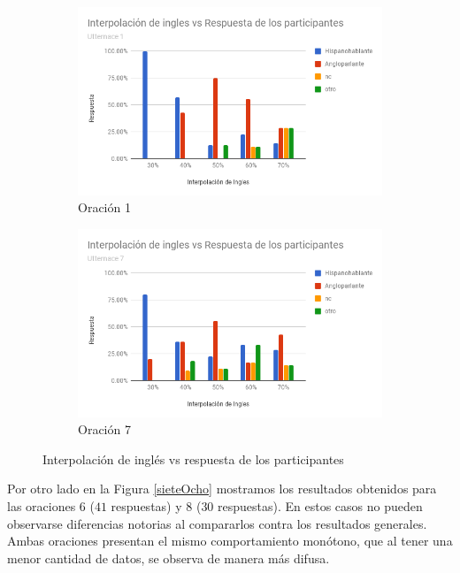 \begin{figure}
\centering
\begin{subfigure}{.5\textwidth}
  \centering
	\includegraphics[trim={0 0 0 2.5cm},clip,width=1\textwidth]{imagenes/nacionalidades/1.png}
  \caption{Oración 1}
\end{subfigure}%
\begin{subfigure}{.5\textwidth}
  \centering
	\includegraphics[trim={0 0 0 2.5cm},clip,width=1\textwidth]{imagenes/nacionalidades/7.png}
  \caption{Oración 7}
\end{subfigure}
\caption{Interpolación de inglés vs respuesta de los participantes}
\label{unoSeis}
\end{figure}


Por otro lado en la Figura \ref{sieteOcho} mostramos los resultados obtenidos para las oraciones $6$ ($41$ respuestas) y $8$ ($30$ respuestas). En estos casos no pueden observarse diferencias notorias al compararlos contra los resultados generales. Ambas oraciones presentan el mismo comportamiento monótono, que al tener una menor cantidad de datos, se observa de manera más difusa.


